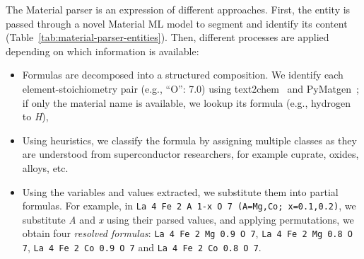 The Material parser is an expression of different approaches. 
First, the entity is passed through a novel Material ML model to segment and identify its content (Table~\ref{tab:material-parser-entities}).
Then, different processes are applied depending on which information is available: 
\begin{itemize}
    \item Formulas are decomposed into a structured composition. We identify each element-stoichiometry pair (e.g., ``O'': 7.0) using text2chem~\cite{kononova2019text} and PyMatgen~\cite{Ong2013}; if only the material name is available, we lookup its formula (e.g., hydrogen to \textit{H}),
    \item Using heuristics, we classify the formula by assigning multiple classes as they are understood from superconductor researchers, for example cuprate, oxides, alloys, etc.
    \item Using the variables and values extracted, we substitute them into partial formulas. For example, in \texttt{La 4 Fe 2 A 1-x O 7 (A=Mg,Co; x=0.1,0.2)}, we substitute \textit{A} and \textit{x} using their parsed values, and applying permutations, we obtain four \textit{resolved formulas}: \texttt{La 4 Fe 2 Mg 0.9 O 7}, \texttt{La 4 Fe 2 Mg 0.8 O 7}, \texttt{La 4 Fe 2 Co 0.9 O 7} and \texttt{La 4 Fe 2 Co 0.8 O 7}.
\end{itemize}

